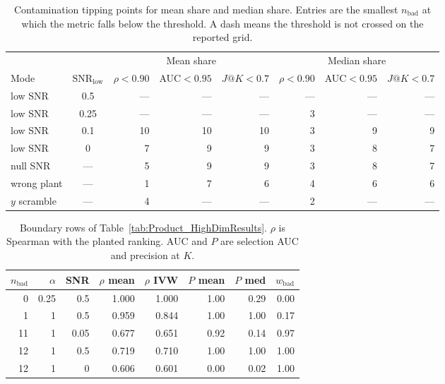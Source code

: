 \begin{table}[t]
\centering
\caption{Contamination tipping points for mean share and median share.
Entries are the smallest \(n_{\mathrm{bad}}\) at which the metric falls
below the threshold.
A dash means the threshold is not crossed on the reported grid.}
\label{tab:federated_tipping}
\small
\setlength{\tabcolsep}{3.5pt}
\begin{tabular}{l c rrr rrr}
\toprule
 & & \multicolumn{3}{c}{Mean share} & \multicolumn{3}{c}{Median share} \\
\cmidrule(lr){3-5} \cmidrule(lr){6-8}
Mode & \(\mathrm{SNR}_{\mathrm{low}}\) & \(\rho<0.90\) & AUC\(<0.95\) & \(J@K<0.7\) & \(\rho<0.90\) & AUC\(<0.95\) & \(J@K<0.7\) \\
\midrule
low SNR    & 0.5  & --- & --- & --- & --- & --- & --- \\
low SNR    & 0.25 & --- & --- & --- & 3   & --- & --- \\
low SNR    & 0.1  & 10  & 10  & 10  & 3   & 9   & 9   \\
low SNR    & 0    & 7   & 9   & 9   & 3   & 8   & 7   \\
null SNR   & ---  & 5   & 9   & 9   & 3   & 8   & 7   \\
wrong plant & --- & 1   & 7   & 6   & 4   & 6   & 6   \\
\(y\) scramble & --- & 4 & --- & --- & 2 & --- & --- \\
\bottomrule
\end{tabular}
\end{table}

\begin{table}[t]
\centering
\caption{Boundary rows of Table~\ref{tab:Product_HighDimResults}.
\(\rho\) is Spearman with the planted ranking.
AUC and \(P\) are selection AUC and precision at \(K\).}
\label{tab:hidim-boundary}
\small
\begin{tabular}{rrrrrrrr}
\toprule
\(n_{\mathrm{bad}}\) & \(\alpha\) & SNR & \(\rho\) mean & \(\rho\) IVW & \(P\) mean & \(P\) med & \(w_{\mathrm{bad}}\) \\
\midrule
0 & 0.25 & 0.5 & 1.000 & 1.000 & 1.00 & 0.29 & 0.00 \\
1 & 1 & 0.5 & 0.959 & 0.844 & 1.00 & 1.00 & 0.17 \\
11 & 1 & 0.05 & 0.677 & 0.651 & 0.92 & 0.14 & 0.97 \\
12 & 1 & 0.5 & 0.719 & 0.710 & 1.00 & 1.00 & 1.00 \\
12 & 1 & 0 & 0.606 & 0.601 & 0.00 & 0.02 & 1.00 \\
\bottomrule
\end{tabular}
\end{table}

